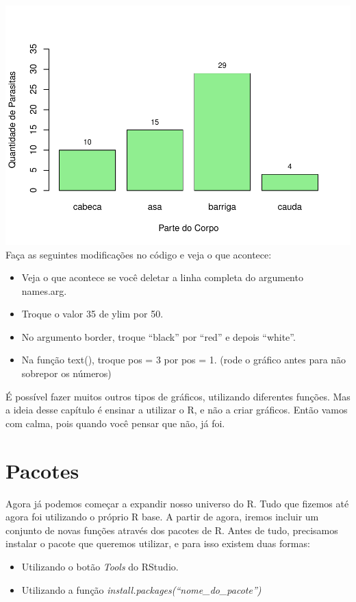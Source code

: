 \documentclass[
]{book}
\providecommand{\tightlist}{%
  \setlength{\itemsep}{0pt}\setlength{\parskip}{0pt}}
\begin{document}
\includegraphics{_main_files/figure-latex/4_basic_hist-1.pdf}
Faça as seguintes modificações no código e veja o que acontece:

\begin{itemize}
\tightlist
\item
  Veja o que acontece se você deletar a linha completa do argumento names.arg.
\item
  Troque o valor 35 de ylim por 50.
\item
  No argumento border, troque ``black'' por ``red'' e depois ``white''.
\item
  Na função text(), troque pos = 3 por pos = 1.
  (rode o gráfico antes para não sobrepor os números)
\end{itemize}

É possível fazer muitos outros tipos de gráficos, utilizando diferentes funções. Mas a ideia desse capítulo é ensinar a utilizar o R, e não a criar gráficos. Então vamos com calma, pois quando você pensar que não, já foi.

\hypertarget{pacotes}{%
\section{Pacotes}\label{pacotes}}

Agora já podemos começar a expandir nosso universo do R. Tudo que fizemos até agora foi utilizando o próprio R base. A partir de agora, iremos incluir um conjunto de novas funções através dos pacotes de R.
Antes de tudo, precisamos instalar o pacote que queremos utilizar, e para isso existem duas formas:

\begin{itemize}
\tightlist
\item
  Utilizando o botão \emph{Tools} do RStudio.
\item
  Utilizando a função \emph{install.packages(``nome\_do\_pacote'')}
\end{itemize}
\end{document}
